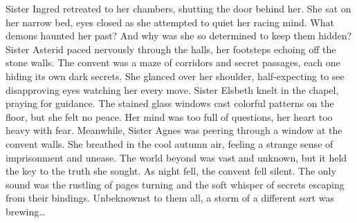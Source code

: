 \documentclass[11pt]{article}
\begin{document}
Sister Ingred retreated to her chambers, shutting the door behind her. She sat on her narrow bed, eyes closed as she attempted to quiet her racing mind. What demons haunted her past? And why was she so determined to keep them hidden?
Sister Asterid paced nervously through the halls, her footsteps echoing off the stone walls. The convent was a maze of corridors and secret passages, each one hiding its own dark secrets. She glanced over her shoulder, half-expecting to see disapproving eyes watching her every move.
Sister Elsbeth knelt in the chapel, praying for guidance. The stained glass windows cast colorful patterns on the floor, but she felt no peace. Her mind was too full of questions, her heart too heavy with fear.
Meanwhile, Sister Agnes was peering through a window at the convent walls. She breathed in the cool autumn air, feeling a strange sense of imprisonment and unease. The world beyond was vast and unknown, but it held the key to the truth she sought.
As night fell, the convent fell silent. The only sound was the rustling of pages turning and the soft whisper of secrets escaping from their bindings. Unbeknownst to them all, a storm of a different sort was brewing\ldots{}
\end{document}
